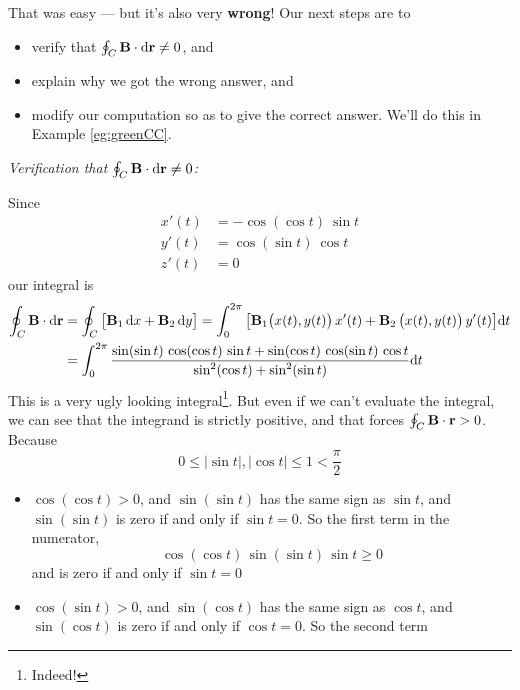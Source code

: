 \begin{eg}
That was easy --- but it's also very \textbf{wrong}!
Our next steps are to 
\begin{itemize}\itemsep1pt \parskip0pt  %
\item
verify that $\oint_C\mathbf{B}\cdot\mathrm{d}\mathbf{r}\ne 0$, and 
\item
explain why we got the wrong answer, and
\item
modify our computation so as to give the correct answer.
We'll do this in Example \ref{eg:greenCC}.
\end{itemize}

\noindent
\emph{Verification that $\oint_C\mathbf{B}\cdot\mathrm{d}\mathbf{r}\ne 0$:}\ \ \ 

\noindent
Since 
\begin{align*}
x'(t) &= -\cos(\cos t)\ \sin t \\
y'(t) &= \cos(\sin t)\ \cos t \\
z'(t) &= 0
\end{align*}
our integral is
\begin{align*}
\oint_C\mathbf{B}\cdot\mathrm{d}\mathbf{r}
&=\oint_C\big[\mathbf{B}_1\,\mathrm{d}x +\mathbf{B}_2\,\mathrm{d}y\big]
=\int_0^{2\pi}\big[\mathbf{B}_1\big(x(t),y(t)\big)\,x'(t) 
            +\mathbf{B}_2\,\big(x(t),y(t)\big)\,y'(t)\big]\mathrm{d}t
\\
&=\int_0^{2\pi}
            \frac{\sin(\sin t)\,\cos(\cos t)\,\sin t
                  +\sin(\cos t)\,\cos(\sin t)\,\cos t}
                  {\sin^2(\cos t) +\sin^2(\sin t)}
            \mathrm{d}t
\end{align*}
This is a very ugly looking integral\footnote{Indeed!}. 
But even if we can't evaluate the 
integral, we can see that the integrand is strictly positive,
and that forces $\oint_C\mathbf{B}\cdot\mathbf{r}>0$. Because
\begin{equation*}
0\le|\sin t|,|\cos t|\le 1<\frac{\pi}{2}
\end{equation*}
\begin{itemize}\itemsep1pt \parskip0pt  %
\item[$\circ$]
$\cos(\cos t)>0$, and $\sin(\sin t)$ has the same sign as $\sin t$,
and $\sin(\sin t)$ is zero if and only if $\sin t=0$. 
So the first term in the numerator,
\begin{equation*}
\cos(\cos t)\,\sin(\sin t)\,\sin t\ge 0
\end{equation*} 
and is zero if and only if $\sin t=0$ 
\item[$\circ$]
$\cos(\sin t)>0$, and $\sin(\cos t)$ has the same sign as $\cos t$, and 
$\sin(\cos t)$ is zero if and only if $\cos t=0$. So the second term 

\end{itemize}
\end{eg}
